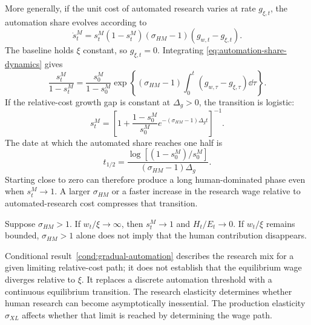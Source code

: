 More generally, if the unit cost of automated research varies at rate $g_{\xi,t}$,
the automation share evolves according to
\begin{equation}
    \dot s^M_t
    =
    s^M_t(1-s^M_t)(\sigma_{HM}-1)
    \left(g_{w,t}-g_{\xi,t}\right).
    \label{eq:automation-share-dynamics}
\end{equation}
The baseline holds $\xi$ constant, so $g_{\xi,t}=0$.
Integrating \eqref{eq:automation-share-dynamics} gives
\begin{equation}
    \frac{s^M_t}{1-s^M_t}
    =
    \frac{s^M_0}{1-s^M_0}
    \exp\left\{
        (\sigma_{HM}-1)\int_0^t
        \left(g_{w,\tau}-g_{\xi,\tau}\right)\dd\tau
    \right\}.
    \label{eq:integrated-automation-odds}
\end{equation}
If the relative-cost growth gap is constant at $\Delta_g>0$, the transition is
logistic:
\begin{equation}
    s^M_t
    =
    \left[
        1+\frac{1-s^M_0}{s^M_0}
        e^{-(\sigma_{HM}-1)\Delta_g t}
    \right]^{-1}.
    \label{eq:logistic-automation-transition}
\end{equation}
The date at which the automated share reaches one half is
\begin{equation}
    t_{1/2}
    =
    \frac{\log[(1-s^M_0)/s^M_0]}
    {(\sigma_{HM}-1)\Delta_g}.
    \label{eq:automation-half-time}
\end{equation}
Starting close to zero can therefore produce a long human-dominated phase even when
$s^M_t\to1$. A larger $\sigma_{HM}$ or a faster increase in the research wage relative
to automated-research cost compresses that transition.

\begin{conditionalresult}
\label{cond:gradual-automation}
Suppose $\sigma_{HM}>1$. If $w_t/\xi\to\infty$, then $s^M_t\to1$ and
$H_t/E_t\to0$. If $w_t/\xi$ remains bounded, $\sigma_{HM}>1$ alone does not imply that
the human contribution disappears.
\end{conditionalresult}

Conditional result~\ref{cond:gradual-automation} describes the research mix for a
given limiting relative-cost path; it does not establish that the equilibrium wage
diverges relative to $\xi$. It replaces a discrete automation threshold
with a continuous equilibrium transition. The research elasticity determines
whether human research can become asymptotically inessential. The production
elasticity $\sigma_{XL}$ affects whether that limit is reached by determining the wage
path.

